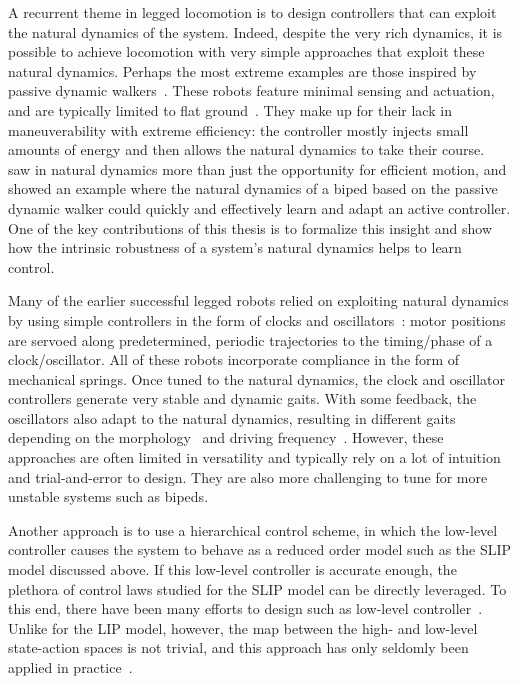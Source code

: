 A recurrent theme in legged locomotion is to design controllers that can exploit the natural dynamics of the system. Indeed, despite the very rich dynamics, it is possible to achieve locomotion with very simple approaches that exploit these natural dynamics.
Perhaps the most extreme examples are those inspired by passive dynamic walkers~\cite{mcgeer1990passive}. These robots feature minimal sensing and actuation, and are typically limited to flat ground~\cite{bhounsule2012design,wisse2006design}. They make up for their lack in maneuverability with extreme efficiency: the controller mostly injects small amounts of energy and then allows the natural dynamics to take their course.~\textcite{tedrake2005learning} saw in natural dynamics more than just the opportunity for efficient motion, and showed an example where the natural dynamics of a biped based on the passive dynamic walker could quickly and effectively learn and adapt an active controller. One of the key contributions of this thesis is to formalize this insight and show how the intrinsic robustness of a system's natural dynamics helps to learn control. \par
Many of the earlier successful legged robots relied on exploiting natural dynamics by using simple controllers in the form of clocks and oscillators~\cite{sprowitz2013towards,buchli2006resonance,altendorfer2001rhex,owaki2013simple}: motor positions are servoed along predetermined, periodic trajectories to the timing/phase of a clock/oscillator. All of these robots incorporate compliance in the form of mechanical springs. Once tuned to the natural dynamics, the clock and oscillator controllers generate very stable and dynamic gaits. With some feedback, the oscillators also adapt to the natural dynamics, resulting in different gaits depending on the morphology~\cite{owaki2013simple} and driving frequency~\cite{owaki2017quadruped}. %
However, these approaches are often limited in versatility and typically rely on a lot of intuition and trial-and-error to design. They are also more challenging to tune for more unstable systems such as bipeds. \par
Another approach is to use a hierarchical control scheme, in which the low-level controller causes the system to behave as a reduced order model such as the SLIP model discussed above.
If this low-level controller is accurate enough, the plethora of control laws studied for the SLIP model can be directly leveraged. To this end, there have been many efforts to design such as low-level controller~\cite{hutter2010slip,poulakakis2009spring,wensing2013high}. Unlike for the LIP model, however, the map between the high- and low-level state-action spaces is not trivial, and this approach has only seldomly been applied in practice~\cite{martin2017experimental}.
